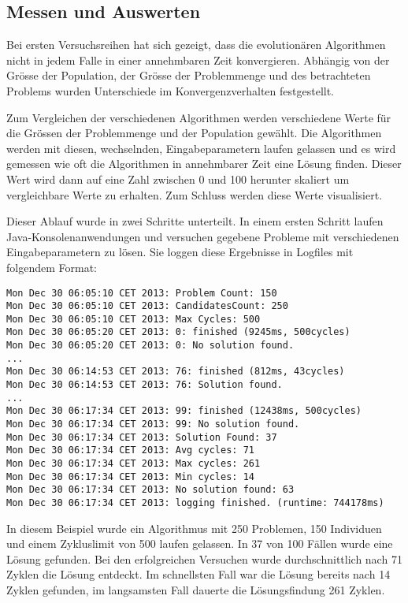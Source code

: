 \subsection{Messen und Auswerten}
Bei ersten Versuchsreihen hat sich gezeigt, dass die evolutionären Algorithmen nicht in jedem Falle in einer annehmbaren Zeit konvergieren. Abhängig von der Grösse der Population, der Grösse der Problemmenge und des betrachteten Problems wurden Unterschiede im Konvergenzverhalten festgestellt.

Zum Vergleichen der verschiedenen Algorithmen werden verschiedene Werte für die Grössen der Problemmenge und der Population gewählt. Die Algorithmen werden mit diesen, wechselnden, Eingabeparametern laufen gelassen und es wird gemessen wie oft die Algorithmen in annehmbarer Zeit eine Lösung finden. Dieser Wert wird dann auf eine Zahl zwischen 0 und 100 herunter skaliert um vergleichbare Werte zu erhalten. Zum Schluss werden diese Werte visualisiert.

Dieser Ablauf wurde in zwei Schritte unterteilt. In einem ersten Schritt laufen Java-Konsolenanwendungen und versuchen gegebene Probleme mit verschiedenen Eingabeparametern zu lösen. Sie loggen diese Ergebnisse in Logfiles mit folgendem Format:

\begin{lstlisting}[caption={Log Format}, label={lst:log_format}]
Mon Dec 30 06:05:10 CET 2013: Problem Count: 150
Mon Dec 30 06:05:10 CET 2013: CandidatesCount: 250
Mon Dec 30 06:05:10 CET 2013: Max Cycles: 500
Mon Dec 30 06:05:20 CET 2013: 0: finished (9245ms, 500cycles)
Mon Dec 30 06:05:20 CET 2013: 0: No solution found.
...
Mon Dec 30 06:14:53 CET 2013: 76: finished (812ms, 43cycles)
Mon Dec 30 06:14:53 CET 2013: 76: Solution found.
...
Mon Dec 30 06:17:34 CET 2013: 99: finished (12438ms, 500cycles)
Mon Dec 30 06:17:34 CET 2013: 99: No solution found.
Mon Dec 30 06:17:34 CET 2013: Solution Found: 37
Mon Dec 30 06:17:34 CET 2013: Avg cycles: 71
Mon Dec 30 06:17:34 CET 2013: Max cycles: 261
Mon Dec 30 06:17:34 CET 2013: Min cycles: 14
Mon Dec 30 06:17:34 CET 2013: No solution found: 63
Mon Dec 30 06:17:34 CET 2013: logging finished. (runtime: 744178ms)
\end{lstlisting}

In diesem Beispiel wurde ein Algorithmus mit 250 Problemen, 150 Individuen und einem Zykluslimit von 500 laufen gelassen. In 37 von 100 Fällen wurde eine Lösung gefunden. Bei den erfolgreichen Versuchen wurde durchschnittlich nach 71 Zyklen die Lösung entdeckt. Im schnellsten Fall war die Lösung bereits nach 14 Zyklen gefunden, im langsamsten Fall dauerte die Lösungsfindung 261 Zyklen.

